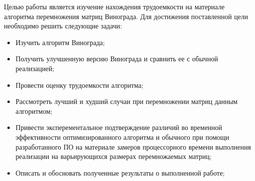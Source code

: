 \Introduction

Целью работы является изучение нахождения трудоемкости на материале алгоритма перемножения матриц Винограда. Для достижения поставленной цели необходимо решить следующие задачи:

\begin{itemize}
\item Изучить алгоритм Винограда;
\item Получить улучшенную версию Винограда и сравнить ее с обычной реализацией;
\item Провести оценку трудоемкости алгоритма;
\item Рассмотреть лучший и худший случаи при перемножении матриц данным алгоритмом;
\item Привести эксперементальное подтверждение различий во временной эффективности оптимизированного алгоритма и обычного при помощи разработанного ПО на материале замеров процессорного времени выполнения реализации на варьирующихся размерах перемножаемых матриц;
\item Описать и обосновать полученные результаты о выполненной работе;
\end{itemize}
